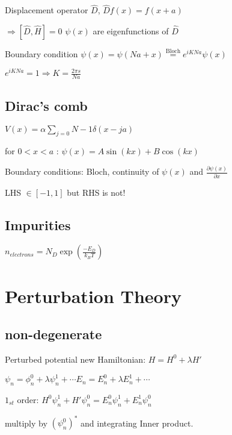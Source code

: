 \documentclass[10pt,a4paper]{scrartcl}
\begin{document}
\begin{multicols*}{3}
	\finn
	
	Displacement operator $\hat{D}$, $\hat{D}f(x)=f(x+a)$
	
	$\Rightarrow [\hat{D},\hat{H}]=0$ \dahe $\psi(x)$ are eigenfunctions of $\hat{D}$
	
	
	Boundary condition $\psi(x)=\psi(Na+x)\overset{\text{Bloch}}{=}e^{iKNa}\psi(x)$
	
	\dahe $e^{iKNa}=1\Rightarrow K=\frac{2\pi s}{Na}$
	
	\subsection{Dirac's comb}
	
	$V(x)=\alpha\sum\limits_{j=0}{N-1}{\delta(x-ja)}$
	
	for $0<x<a$ : $\psi(x)=A\sin(kx)+B\cos(kx)$
	
	Boundary conditions: Bloch, continuity of $\psi(x)$ and $\frac{\partial \psi(x)}{\partial x}$
	
	
	\dahe LHS $\in[-1,1]$ but RHS is not!
	
	
	\subsection{Impurities}
	
	$n_{electrons}=N_D \exp(\frac{-E_D}{k_BT})$
	
	\section{Perturbation Theory}
	
	\subsection{non-degenerate}
	
	Perturbed potential \dahe new Hamiltonian: $H=H^0+\lambda H'$
	
	$\psi_n=\phi_n^0+\lambda\psi_n^1+\cdots$\hfill$E_n=E_n^0+\lambda E_n^1+\cdots$
	
	$1_{st}$ order: $H^0\psi_n^1+H'\psi_n^0=E_n^0\psi_n^1+E_n^1\psi_n^0$
	
	\dahe multiply by $(\psi_n^0)^\ast$ and integrating \dahe Inner product.
	

\end{multicols*}
\end{document}
